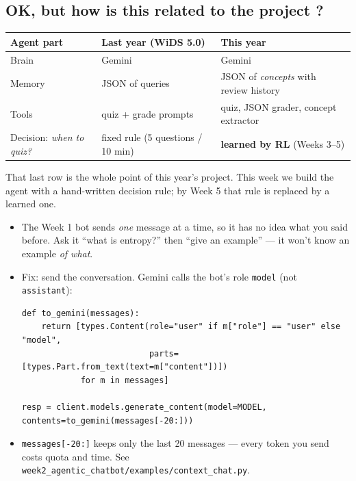 \subsection{OK, but how is this related to the project ?}
\begin{center}
\begin{tabular}{@{}lll@{}}
\toprule
\textbf{Agent part} & \textbf{Last year (WiDS 5.0)} & \textbf{This year}\\
\midrule
Brain & Gemini & Gemini\\
Memory & JSON of queries & JSON of \emph{concepts} with review history\\
Tools & quiz + grade prompts & quiz, JSON grader, concept extractor\\
Decision: \emph{when to quiz?} & fixed rule (5 questions / 10 min) & \textbf{learned by RL} (Weeks 3--5)\\
\bottomrule
\end{tabular}
\end{center}
That last row is the whole point of this year's project. This week we build the agent with a hand-written decision rule;
by Week 5 that rule is replaced by a learned one.

\begin{itemize}
  \item The Week 1 bot sends \emph{one} message at a time, so it has no idea what you said before. Ask it
        ``what is entropy?'' then ``give an example'' --- it won't know an example \emph{of what}.
  \item Fix: send the conversation. Gemini calls the bot's role \texttt{model} (not \texttt{assistant}):
\begin{lstlisting}
def to_gemini(messages):
    return [types.Content(role="user" if m["role"] == "user" else "model",
                          parts=[types.Part.from_text(text=m["content"])])
            for m in messages]

resp = client.models.generate_content(model=MODEL, contents=to_gemini(messages[-20:]))
\end{lstlisting}
  \item \texttt{messages[-20:]} keeps only the last 20 messages --- every token you send costs quota and time.
        See \texttt{week2\_agentic\_chatbot/examples/context\_chat.py}.
\end{itemize}


